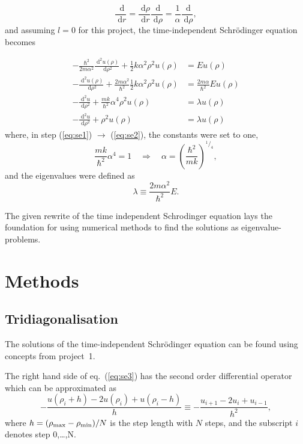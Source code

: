 \documentclass[a4paper,11pt]{article}
\newcommand{\diff}{\ensuremath{\; \text{d}}}
\begin{document}
\[ \frac{\diff}{\diff r} = \frac{\diff \rho}{\diff r} \frac{\diff}{\diff \rho} = \frac{1}{\alpha} \frac{\diff}{\diff \rho}, \]
and assuming $l=0$ for this project, the time-independent Schr\"{o}dinger equation becomes

\begin{align}
    -\frac{\hbar^2}{2m\alpha^2} \frac{\diff^2 u(\rho)}{\diff \rho^2} + \frac{1}{2} k \alpha^2 \rho^2 u(\rho) &= E u(\rho) \label{eq:se0} \\
    -\frac{\diff^2 u(\rho)}{\diff \rho^2} + \frac{2m \alpha^2}{\hbar^2}\frac{1}{2} k \alpha^2 \rho^2 u(\rho) &= \frac{2m\alpha}{\hbar^2} E u(\rho) \label{eq:se1} \\
    -\frac{\diff^2 u}{\diff \rho^2} + \frac{mk}{\hbar^2}\alpha^4 \rho^2 u(\rho) &= \lambda u(\rho) \label{eq:se2} \\
    -\frac{\diff^2 u}{\diff \rho^2} + \rho^2 u(\rho) &= \lambda u(\rho) \label{eq:se3}
\end{align}
where, in step (\ref{eq:se1}) $\to$ (\ref{eq:se2}), the constants were set to one,
\[ \frac{mk}{\hbar^2}\alpha^4 = 1 \quad \Rightarrow \quad \alpha = \left( \frac{\hbar^2}{mk}  \right)^{^1\! / _4}, \]
and the eigenvalues were defined as
\begin{equation}
    \lambda \equiv \frac{2m\alpha^2}{\hbar^2} E. 
    \label{eq:eigvals}
\end{equation}

The given rewrite of the time independent Schr{o}dinger equation lays the foundation for using numerical methods to find the solutions as eigenvalue-problems.

\section{Methods}
\subsection{Tridiagonalisation}
The solutions of the time-independent Schr\"{o}dinger equation can be found using concepts from project~1.

The right hand side of eq.~(\ref{eq:se3}) has the second order differential operator which can be approximated as
\[ -\frac{u\left( \rho_i + h \right) - 2u(\rho_i) + u\left( \rho_i - h \right)}{h} \equiv -\frac{u_{i+1} - 2u_i + u_{i-1}}{h^2}, \]
where $h = (\rho_{\rm max} - \rho_{\rm min})/N$ is the step length with $N$ steps, and the subscript $i$ denotes step 0,\dots,N. 
\end{document}

